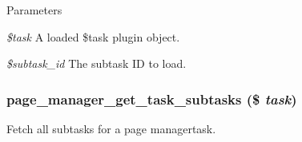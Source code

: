 \begin{DoxyParams}{Parameters}
\item[{\em \$task}]A loaded \$task plugin object. \item[{\em \$subtask\_\-id}]The subtask ID to load. \end{DoxyParams}
\hypertarget{page__manager_8module_aaf5c93fb26ab4eb49813ac07f4a49a01}{
\subsubsection[{page\_\-manager\_\-get\_\-task\_\-subtasks}]{\setlength{\rightskip}{0pt plus 5cm}page\_\-manager\_\-get\_\-task\_\-subtasks (\$ {\em task})}}
\label{page__manager_8module_aaf5c93fb26ab4eb49813ac07f4a49a01}
Fetch all subtasks for a page managertask.


